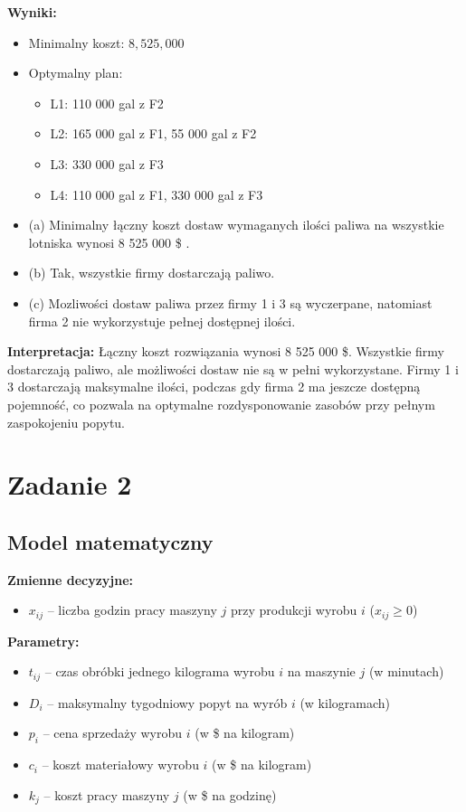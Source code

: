 \documentclass[a4paper,12pt]{article}
\begin{document}
\textbf{Wyniki:}
\begin{itemize}
\item Minimalny koszt: $8{,}525{,}000$
\item Optymalny plan:
\begin{itemize}
\item L1: 110 000 gal z F2
\item L2: 165 000 gal z F1, 55 000 gal z F2
\item L3: 330 000 gal z F3
\item L4: 110 000 gal z F1, 330 000 gal z F3
\end{itemize}
\item (a) Minimalny łączny koszt dostaw wymaganych ilości paliwa na wszystkie lotniska wynosi 8 525 000 \$ .
\item (b) Tak, wszystkie firmy dostarczają paliwo.
\item (c) Mozliwości dostaw paliwa przez firmy 1 i 3 są wyczerpane, natomiast firma 2 nie wykorzystuje pełnej dostępnej ilości.
\end{itemize}

\textbf{Interpretacja:} Łączny koszt rozwiązania wynosi 8 525 000 \$. Wszystkie firmy dostarczają paliwo, ale możliwości dostaw nie są w pełni wykorzystane. Firmy 1 i 3 dostarczają maksymalne ilości, podczas gdy firma 2 ma jeszcze dostępną pojemność, co pozwala na optymalne rozdysponowanie zasobów przy pełnym zaspokojeniu popytu.

\section*{Zadanie 2}
\subsection*{Model matematyczny}

\textbf{Zmienne decyzyjne:}
\begin{itemize}
\item $x_{ij}$ -- liczba godzin pracy maszyny $j$ przy produkcji wyrobu $i$ ($x_{ij} \geq 0$)
\end{itemize}

\textbf{Parametry:}
\begin{itemize}
\item $t_{ij}$ -- czas obróbki jednego kilograma wyrobu $i$ na maszynie $j$ (w minutach)
\item $D_i$ -- maksymalny tygodniowy popyt na wyrób $i$ (w kilogramach)
\item $p_i$ -- cena sprzedaży wyrobu $i$ (w \$ na kilogram)
\item $c_i$ -- koszt materiałowy wyrobu $i$ (w \$ na kilogram)
\item $k_j$ -- koszt pracy maszyny $j$ (w \$ na godzinę)
\end{itemize}
\end{document}
